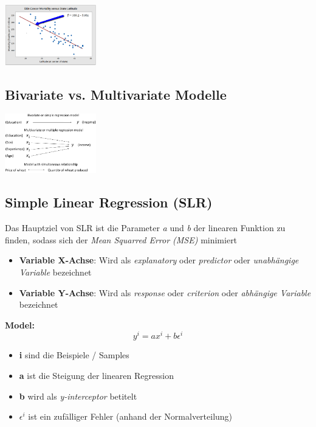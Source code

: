 \documentclass{article}
\newenvironment{Figure}
	{\par\medskip\noindent\minipage{\linewidth}}
	{\endminipage\par\medskip}
\theoremstyle{merke}
\theoremstyle{definition}
\begin{document}
    \begin{Figure}
    \centering
    \includegraphics[width=150px]{img/LinearRegressionExample.png}
        \label{fig:Ein Beispiel für die lineare Regression}
    \end{Figure}
        \subsection{Bivariate vs. Multivariate Modelle}

    \begin{Figure}
    \centering
    \includegraphics[width=150px]{img/BiMultivariate.png}
        \label{fig:Ein Beispiel für den Unterschied von Bivariate und Multivariate Modelle}
    \end{Figure}
    
        \subsection{Simple Linear Regression (SLR)}
        Das Hauptziel von SLR ist die Parameter \textit{a} und \textit{b} der linearen Funktion zu finden, sodass sich der \textit{Mean Squarred Error (MSE)} minimiert
        \begin{itemize}
            \item \textbf{Variable X-Achse}: Wird als \textit{explanatory} oder \textit{predictor} oder \textit{unabhängige Variable} bezeichnet
            \item \textbf{Variable Y-Achse}: Wird als \textit{response} oder \textit{criterion} oder \textit{abhängige Variable} bezeichnet
        \end{itemize}
        \textbf{Model:}
        \begin{equation}
            y^{i} = ax^{i} + b \epsilon^{i}
        \end{equation}
        \begin{itemize}
            \item \textbf{i} sind die Beispiele / Samples
            \item \textbf{a} ist die Steigung der linearen Regression
            \item \textbf{b} wird als \textit{y-interceptor} betitelt
            \item \textbf{$\epsilon^{i}$} ist ein zufälliger Fehler (anhand der Normalverteilung)
        \end{itemize}
\end{document}

